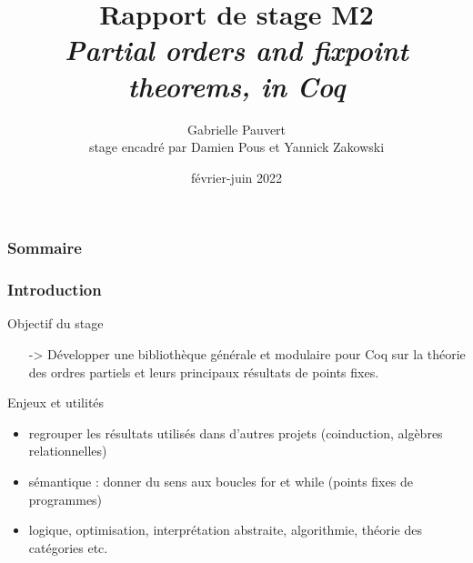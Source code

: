 \documentclass{beamer}
\title[\textit{Partial orders and fixpoint theorems, in Coq} ~~~~~~~~~~~~~~~~~~~~~ \insertframenumber]{Rapport de stage M2 \\
\textit{Partial orders and fixpoint theorems, in Coq}}
\date{février-juin 2022}
\author[Gabrielle Pauvert]{Gabrielle Pauvert\\
stage encadré par Damien Pous et Yannick Zakowski}
\begin{document}
\begin{frame}
\titlepage
\end{frame}

\begin{frame}
\frametitle{Sommaire}
\small{\tableofcontents}
\end{frame}


\begin{frame}
\frametitle{Introduction}

\begin{block}{Objectif du stage}
\begin{itemize}
\item[->] Développer une bibliothèque générale et modulaire pour Coq sur la théorie des ordres partiels et leurs principaux résultats de points fixes.
\end{itemize}
\end{block}



\begin{exampleblock}{Enjeux et utilités}
\begin{itemize}
\item regrouper les résultats utilisés dans d'autres projets (coinduction, algèbres relationnelles)
\item sémantique : donner du sens aux boucles for et while (points fixes de programmes)
\item logique, optimisation, interprétation abstraite, algorithmie, théorie des catégories etc.
\end{itemize}
\end{exampleblock}

\end{frame}


\end{document}

